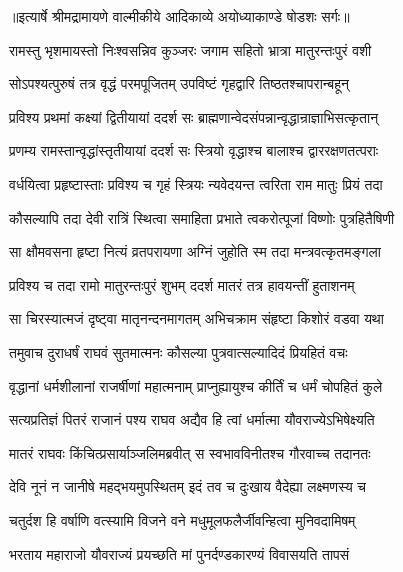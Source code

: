 {॥इत्यार्षे श्रीमद्रामायणे वाल्मीकीये आदिकाव्ये अयोध्याकाण्डे षोडशः सर्गः॥}


\twolineshloka
{रामस्तु भृशमायस्तो निःश्वसन्निव कुञ्जरः}
{जगाम सहितो भ्रात्रा मातुरन्तःपुरं वशी} %

\twolineshloka
{सोऽपश्यत्पुरुषं तत्र वृद्धं परमपूजितम्}
{उपविष्टं गृहद्वारि तिष्ठतश्चापरान्बहून्} %

\twolineshloka
{प्रविश्य प्रथमां कक्ष्यां द्वितीयायां ददर्श सः}
{ब्राह्मणान्वेदसंपन्नान्वृद्धान्राज्ञाभिसत्कृतान्} %

\twolineshloka
{प्रणम्य रामस्तान्वृद्धांस्तृतीयायां ददर्श सः}
{स्त्रियो वृद्धाश्च बालाश्च द्वाररक्षणतत्पराः} %

\twolineshloka
{वर्धयित्वा प्रहृष्टास्ताः प्रविश्य च गृहं स्त्रियः}
{न्यवेदयन्त त्वरिता राम मातुः प्रियं तदा} %

\twolineshloka
{कौसल्यापि तदा देवी रात्रिं स्थित्वा समाहिता}
{प्रभाते त्वकरोत्पूजां विष्णोः पुत्रहितैषिणी} %

\twolineshloka
{सा क्षौमवसना हृष्टा नित्यं व्रतपरायणा}
{अग्निं जुहोति स्म तदा मन्त्रवत्कृतमङ्गला} %

\twolineshloka
{प्रविश्य च तदा रामो मातुरन्तःपुरं शुभम्}
{ददर्श मातरं तत्र हावयन्तीं हुताशनम्} %

\twolineshloka
{सा चिरस्यात्मजं दृष्ट्वा मातृनन्दनमागतम्}
{अभिचक्राम संहृष्टा किशोरं वडवा यथा} %

\twolineshloka
{तमुवाच दुराधर्षं राघवं सुतमात्मनः}
{कौसल्या पुत्रवात्सल्यादिदं प्रियहितं वचः} %

\twolineshloka
{वृद्धानां धर्मशीलानां राजर्षीणां महात्मनाम्}
{प्राप्नुह्यायुश्च कीर्तिं च धर्मं चोपहितं कुले} %

\twolineshloka
{सत्यप्रतिज्ञं पितरं राजानं पश्य राघव}
{अद्यैव हि त्वां धर्मात्मा यौवराज्येऽभिषेक्ष्यति} %

\twolineshloka
{मातरं राघवः किंचित्प्रसार्याञ्जलिमब्रवीत्}
{स स्वभावविनीतश्च गौरवाच्च तदानतः} %

\twolineshloka
{देवि नूनं न जानीषे महद्भयमुपस्थितम्}
{इदं तव च दुःखाय वैदेह्या लक्ष्मणस्य च} %

\twolineshloka
{चतुर्दश हि वर्षाणि वत्स्यामि विजने वने}
{मधुमूलफलैर्जीवन्हित्वा मुनिवदामिषम्} %

\twolineshloka
{भरताय महाराजो यौवराज्यं प्रयच्छति}
{मां पुनर्दण्डकारण्यं विवासयति तापसं} %

